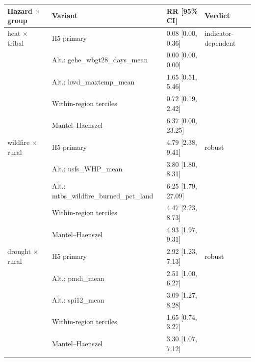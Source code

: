 \begin{tabular}{llll}\toprule
Hazard $\times$ group & Variant & RR [95\% CI] & Verdict\\\midrule
heat $\times$ tribal & H5 primary & 0.08 [0.00, 0.36] & indicator-dependent\\
 & Alt.: gehe\_wbgt28\_days\_mean & 0.00 [0.00, 0.00] & \\
 & Alt.: hwd\_maxtemp\_mean & 1.65 [0.51, 5.46] & \\
 & Within-region terciles & 0.72 [0.19, 2.42] & \\
 & Mantel--Haenszel & 6.37 [0.00, 23.25] & \\
\addlinespace
wildfire $\times$ rural & H5 primary & 4.79 [2.38, 9.41] & robust\\
 & Alt.: usfs\_WHP\_mean & 3.80 [1.80, 8.31] & \\
 & Alt.: mtbs\_wildfire\_burned\_pct\_land & 6.25 [1.79, 27.09] & \\
 & Within-region terciles & 4.47 [2.23, 8.73] & \\
 & Mantel--Haenszel & 4.93 [1.97, 9.31] & \\
\addlinespace
drought $\times$ rural & H5 primary & 2.92 [1.23, 7.13] & robust\\
 & Alt.: pmdi\_mean & 2.51 [1.00, 6.27] & \\
 & Alt.: spi12\_mean & 3.09 [1.27, 8.28] & \\
 & Within-region terciles & 1.65 [0.74, 3.27] & \\
 & Mantel--Haenszel & 3.30 [1.07, 7.12] & \\
\addlinespace
\bottomrule\end{tabular}
